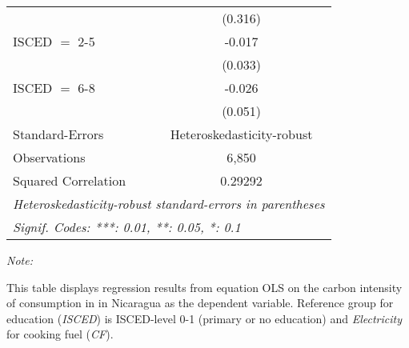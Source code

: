 \begin{table}[htbp!]
\begin{adjustbox}{width = 1\textwidth, max height = 0.95\textheight, center}
\begin{threeparttable}[b]
\begin{tabular}{lc}
                                & (0.316)\\   
            ISCED $=$ 2-5       & -0.017\\   
                                & (0.033)\\   
            ISCED $=$ 6-8       & -0.026\\   
                                & (0.051)\\   
            \midrule 
            Standard-Errors     & Heteroskedasticity-robust \\   
            Observations        & 6,850\\  
            Squared Correlation & 0.29292\\  
            \midrule \midrule
            \multicolumn{2}{l}{\emph{Heteroskedasticity-robust standard-errors in parentheses}}\\
            \multicolumn{2}{l}{\emph{Signif. Codes: ***: 0.01, **: 0.05, *: 0.1}}\\
         \end{tabular}
         
         \begin{tablenotes}\item \medskip \textit{Note:}
            \item This table displays regression results from equation OLS on the carbon intensity of consumption in  in Nicaragua as the dependent variable. Reference group for education (\textit{ISCED}) is ISCED-level 0-1 (primary or no education) and \textit{Electricity} for cooking fuel (\textit{CF}).
         \end{tablenotes}
      \end{threeparttable}
   \end{adjustbox}
\end{table}



